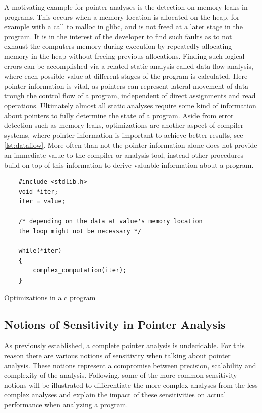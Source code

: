 A motivating example for pointer analyses is the detection on memory leaks in programs.
This occurs when a memory location is allocated on the heap, for example with a call to malloc in glibc, and is not freed at a later stage in the program.
It is in the interest of the developer to find such faults as to not exhaust the computers memory during execution by repeatedly allocating memory in the heap without freeing previous allocations.
Finding such logical errors can be accomplished via a related static analysis called data-flow analysis, where each possible value at different stages of the program is calculated. Here pointer information is vital, as pointers can represent lateral movement of data trough the control flow of a program, independent of direct assignments and read operations. Ultimately almost all static analyses require some kind of information about pointers to fully determine the state of a program.
Aside from error detection such as memory leaks, optimizations are another aspect of compiler systems, where pointer information is important to achieve better results, see \autoref{lst:dataflow}.
More often than not the pointer information alone does not provide an immediate value to the compiler or analysis tool, instead other procedures build on top of this information to derive valuable information about a program.

\begin{listing}
    \begin{verbatim}
    #include <stdlib.h>
    void *iter;
    iter = value;

    /* depending on the data at value's memory location 
    the loop might not be necessary */
    
    while(*iter)
    {
        complex_computation(iter);
    }
    \end{verbatim}
    \caption{Optimizations in a c program}
    \label{lst:dataflow}
\end{listing}

\subsection{Notions of Sensitivity in Pointer Analysis}
As previously established, a complete pointer analysis is undecidable.
For this reason there are various notions of sensitivity when talking about pointer analysis.
These notions represent a compromise between precision, scalability and complexity of the analysis.
Following, some of the more common sensitivity notions will be illustrated to differentiate the more complex analyses from the less complex analyses and explain the impact of these sensitivities on actual performance when analyzing a program.

